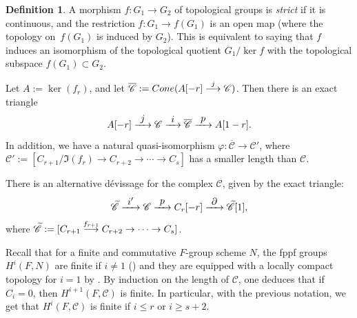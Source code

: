 \documentclass[10pt,a4paper]{amsart}
\let\mathcal\mathscr
\newcommand\To[1]{\mathchoice{\xrightarrow{\textstyle\kern4pt#1\kern3pt}}{\stackrel{#1}{\longrightarrow}}{}{}}
\theoremstyle{plain}
\theoremstyle{definition}
\newtheorem{defi}[theo]{Definition}
\newcommand \cC {\mathcal{C}}
\begin{document}
\begin{defi}
A morphism $f: G_1 \to G_2$
of topological groups is \emph{strict} if it is continuous, and
the restriction $f: G_1 \to f(G_1)$ is
an open map (where the topology on~$f(G_1)$ is induced by $G_2$). This is
equivalent to saying that $f$ induces an isomorphism of the topological
quotient $G_1/\ker f$ with the topological subspace $f(G_1) \subset G_2$.
\end{defi}

Let $A:= \ker(f_r)$, and let $\overline{\cC}:= \textup{Cone}(A[-r] \To{j} \cC)$. Then there is an exact triangle%
\begin{equation} \label{devissage complexe}
A[-r] \To{j} \cC \To{i} \overline{\cC} \To{p} A[1-r].
\end{equation}
In addition, we have a natural quasi-isomorphism $\varphi: \overline{\cC} \to \cC'$, where $\cC':= [C_{r+1}/\Im (f_r) \to C_{r+2} \to \cdots\to C_s]$ has a smaller length than $\cC$.

There is an alternative dévissage for the complex $\cC$, given by
the exact triangle:
\begin{equation} \label{devissage complexe bis}
\widetilde{\cC} \To{i'} \cC \To{p} C_r[-r] \To{\partial} \widetilde{\cC}[1],
\end{equation}
where $\widetilde{\cC}:= [C_{r+1} \To{f_{r+1}} C_{r+2} \to \cdots\to C_s]$.

Recall that for a finite and commutative $F$-group scheme $N$, the fppf groups
$H^i(F,N)$ are finite if $i \neq 1$ (\cite[\S III.6]{MilADT}) and they are
equipped with a locally compact topology for $i=1$ by \cite{Ces}.
By induction on the length of $\cC$, one deduces that if $C_i = 0$, then $H^{i+1}(F, \cC)$ is finite. In particular, with the previous notation, we get that $H^i(F, \cC)$ is finite if $i \leq r$ or $i \geq s+2$.
\end{document}
